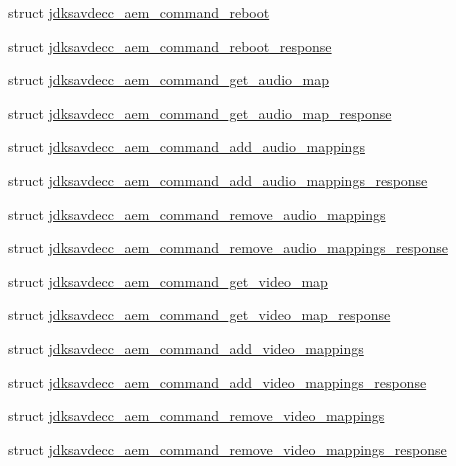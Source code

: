 \begin{DoxyCompactItemize}
\item 
struct \hyperlink{structjdksavdecc__aem__command__reboot}{jdksavdecc\+\_\+aem\+\_\+command\+\_\+reboot}
\item 
struct \hyperlink{structjdksavdecc__aem__command__reboot__response}{jdksavdecc\+\_\+aem\+\_\+command\+\_\+reboot\+\_\+response}
\item 
struct \hyperlink{structjdksavdecc__aem__command__get__audio__map}{jdksavdecc\+\_\+aem\+\_\+command\+\_\+get\+\_\+audio\+\_\+map}
\item 
struct \hyperlink{structjdksavdecc__aem__command__get__audio__map__response}{jdksavdecc\+\_\+aem\+\_\+command\+\_\+get\+\_\+audio\+\_\+map\+\_\+response}
\item 
struct \hyperlink{structjdksavdecc__aem__command__add__audio__mappings}{jdksavdecc\+\_\+aem\+\_\+command\+\_\+add\+\_\+audio\+\_\+mappings}
\item 
struct \hyperlink{structjdksavdecc__aem__command__add__audio__mappings__response}{jdksavdecc\+\_\+aem\+\_\+command\+\_\+add\+\_\+audio\+\_\+mappings\+\_\+response}
\item 
struct \hyperlink{structjdksavdecc__aem__command__remove__audio__mappings}{jdksavdecc\+\_\+aem\+\_\+command\+\_\+remove\+\_\+audio\+\_\+mappings}
\item 
struct \hyperlink{structjdksavdecc__aem__command__remove__audio__mappings__response}{jdksavdecc\+\_\+aem\+\_\+command\+\_\+remove\+\_\+audio\+\_\+mappings\+\_\+response}
\item 
struct \hyperlink{structjdksavdecc__aem__command__get__video__map}{jdksavdecc\+\_\+aem\+\_\+command\+\_\+get\+\_\+video\+\_\+map}
\item 
struct \hyperlink{structjdksavdecc__aem__command__get__video__map__response}{jdksavdecc\+\_\+aem\+\_\+command\+\_\+get\+\_\+video\+\_\+map\+\_\+response}
\item 
struct \hyperlink{structjdksavdecc__aem__command__add__video__mappings}{jdksavdecc\+\_\+aem\+\_\+command\+\_\+add\+\_\+video\+\_\+mappings}
\item 
struct \hyperlink{structjdksavdecc__aem__command__add__video__mappings__response}{jdksavdecc\+\_\+aem\+\_\+command\+\_\+add\+\_\+video\+\_\+mappings\+\_\+response}
\item 
struct \hyperlink{structjdksavdecc__aem__command__remove__video__mappings}{jdksavdecc\+\_\+aem\+\_\+command\+\_\+remove\+\_\+video\+\_\+mappings}
\item 
struct \hyperlink{structjdksavdecc__aem__command__remove__video__mappings__response}{jdksavdecc\+\_\+aem\+\_\+command\+\_\+remove\+\_\+video\+\_\+mappings\+\_\+response}

\end{DoxyCompactItemize}
